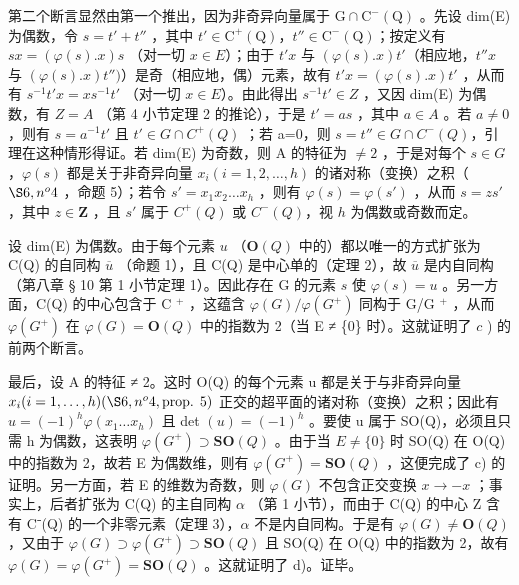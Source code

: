 第二个断言显然由第一个推出，因为非奇异向量属于 \(\mathrm{G}\cap\mathrm{C}^{-}(\mathrm{Q})\) 。先设 dim(E) 为偶数，令 \(s=t'+t''\) ，其中 \(t'\in\mathrm{C}^{+}(\mathrm{Q})\)，\(t''\in\mathrm{C}^{-}(\mathrm{Q})\)；按定义有 \(sx=(\varphi(s).x)s\) （对一切 \(x\in E\)）；由于 \(t'x\) 与 \((\varphi(s).x)t'\)（相应地，\(t''x\) 与 \((\varphi(s).x)t'')\)）是奇（相应地，偶）元素，故有 \(t'x=(\varphi(s).x)t'\) ，从而有 \(s^{-1}t'x=xs^{-1}t'\) （对一切 \(x\in E\)）。由此得出 \(s^{-1}t'\in Z\) ，又因 dim(E) 为偶数，有 \(Z=A\) （第 4 小节定理 2 的推论），于是 \(t'=as\) ，其中 \(a\in A\) 。若 \(a\neq0\) ，则有 \(s=a^{-1}t'\) 且 \(t'\in G\cap C^{+}(Q)\) ；若 a=0，则 \(s=t''\in G\cap C^{-}(Q)\)，引理在这种情形得证。若 dim(E) 为奇数，则 A 的特征为 \(\neq2\) ，于是对每个 \(s\in G\) ，\(\varphi(s)\) 都是关于非奇异向量 \(x_{i} (i = 1,2,\ldots,h)\) 的诸对称（变换）之积（ \(\S 6, n^{o} 4\) ，命题 5）；若令 \(s' = x_{1}x_{2}\ldots x_{h}\) ，则有 \(\varphi(s) = \varphi(s')\) ，从而 \(s = zs'\) ，其中 \(z \in \mathbf{Z}\) ，且 \(s'\) 属于 \(C^{+}(Q)\) 或 \(C^{-}(Q)\)，视 \(h\) 为偶数或奇数而定。

设 dim(E) 为偶数。由于每个元素 \(u\) （\(\mathbf{O}(Q)\) 中的）都以唯一的方式扩张为 C(Q) 的自同构 \(\overline{u}\) （命题 1），且 C(Q) 是中心单的（定理 2），故 \(\overline{u}\) 是内自同构（第八章 § 10 第 1 小节定理 1）。因此存在 G 的元素 \(s\) 使 \(\varphi(s) = u\) 。另一方面，C(Q) 的中心包含于 C \(^{+}\) ，这蕴含 \(\varphi(G)/\varphi(G^{+})\) 同构于 G/G \(^{+}\) ，从而 \(\varphi(G^{+})\) 在 \(\varphi(G) = \mathbf{O}(Q)\) 中的指数为 2（当 E ≠ \{0\} 时）。这就证明了 \(c\) ) 的前两个断言。

最后，设 A 的特征 ≠ 2。这时 O(Q) 的每个元素 u 都是关于与非奇异向量 \(x_{i} (i = 1, \ldots, h) (\S 6, n^{o} 4, \text{prop. } 5)\) 正交的超平面的诸对称（变换）之积；因此有 \(u = (-1)^{h} \varphi(x_{1} \ldots x_{h})\) 且 det \((u) = (-1)^{h}\) 。要使 u 属于 SO(Q)，必须且只需 h 为偶数，这表明 \(\varphi(G^{+}) \supset \mathbf{SO}(Q)\) 。由于当 \(E \neq \{0\}\) 时 SO(Q) 在 O(Q) 中的指数为 2，故若 E 为偶数维，则有 \(\varphi(G^{+}) = \mathbf{SO}(Q)\) ，这便完成了 c) 的证明。另一方面，若 E 的维数为奇数，则 \(\varphi(G)\) 不包含正交变换 \(x \to -x\) ；事实上，后者扩张为 C(Q) 的主自同构 \(\alpha\) （第 1 小节），而由于 C(Q) 的中心 Z 含有 C⁻(Q) 的一个非零元素（定理 3），\(\alpha\) 不是内自同构。于是有 \(\varphi(G) \neq \mathbf{O}(Q)\) ，又由于 \(\varphi(G) \supset \varphi(G^{+}) \supset \mathbf{SO}(Q)\) 且 SO(Q) 在 O(Q) 中的指数为 2，故有 \(\varphi(G) = \varphi(G^{+}) = \mathbf{SO}(Q)\) 。这就证明了 d)。证毕。

